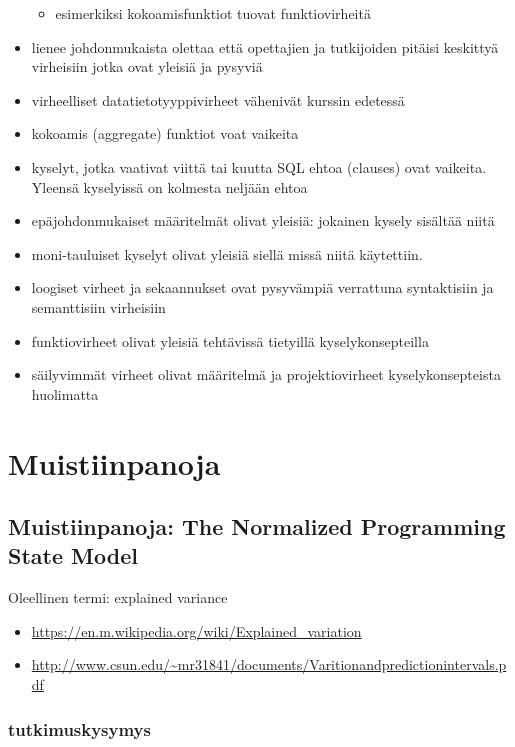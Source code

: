 \begin{itemize}
\begin{itemize}
        \item esimerkiksi kokoamisfunktiot tuovat funktiovirheitä
    \end{itemize}
    \item lienee johdonmukaista olettaa että opettajien ja tutkijoiden pitäisi keskittyä virheisiin jotka ovat yleisiä ja pysyviä
    \item virheelliset datatietotyyppivirheet vähenivät kurssin edetessä
    \item kokoamis (aggregate) funktiot voat vaikeita
    \item kyselyt, jotka vaativat viittä tai kuutta SQL ehtoa (clauses) ovat vaikeita. Yleensä kyselyissä on kolmesta neljään ehtoa
    \item epäjohdonmukaiset määritelmät olivat yleisiä: jokainen kysely sisältää niitä
    \item moni-tauluiset kyselyt olivat yleisiä siellä missä niitä käytettiin.
    \item loogiset virheet ja sekaannukset ovat pysyvämpiä verrattuna syntaktisiin ja semanttisiin virheisiin
    \item funktiovirheet olivat yleisiä tehtävissä tietyillä kyselykonsepteilla
    \item säilyvimmät virheet olivat määritelmä ja projektiovirheet kyselykonsepteista huolimatta
\end{itemize}

\chapter{Muistiinpanoja}

\section{Muistiinpanoja: The Normalized Programming State Model}

Oleellinen termi: explained variance
\begin{itemize}
    \item \url{https://en.m.wikipedia.org/wiki/Explained\_variation}
    \item \url{http://www.csun.edu/~mr31841/documents/Varitionandpredictionintervals.pdf}
\end{itemize}

\subsection{tutkimuskysymys}

